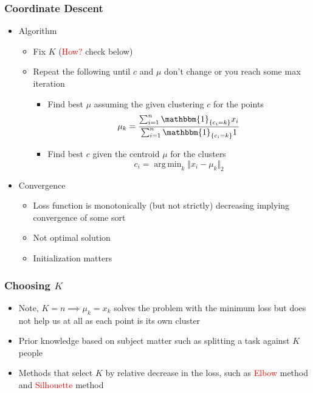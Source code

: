\documentclass{article}
\DeclareMathOperator*{\argmin}{arg\,min}
\newcommand{\red}[1]{\textcolor{red}{#1}}
\begin{document}
\subsubsection{Coordinate Descent}
\begin{itemize}
    \item Algorithm
        \begin{itemize}
            \item Fix $K$ (\red{How?} check below)
            \item Repeat the following until $c$ and $\mu$ don't change or you reach some max iteration
            \begin{itemize}
                \item Find best $\mu$ assuming the given clustering $c$ for the points
                    $$\mu_k = \frac{\sum_{i=1}^n \mathbbm{1}_{\{c_i=k\}} x_i}{\sum_{i=1}^n \mathbbm{1}_{\{c_i=k\}} 1}$$
                \item Find best $c$ given the centroid $\mu$ for the clusters
                    $$c_i = \argmin_{k} \Vert x_i-\mu_k \Vert_2$$
            \end{itemize}
        \end{itemize}
    \item Convergence
        \begin{itemize}
            \item Loss function is monotonically (but not strictly) decreasing implying convergence of some sort
            \item Not optimal solution
            \item Initialization matters
        \end{itemize}
\end{itemize}

\subsubsection{Choosing $K$}
\begin{itemize}
    \item Note, $K=n \implies \mu_k = x_k$ solves the problem with the minimum loss but does not help us at all as each point is its own cluster
    \item Prior knowledge based on subject matter such as splitting a task against $K$ people
    \item Methods that select $K$ by relative decrease in the loss, such as \red{Elbow} method and \red{Silhouette} method
\end{itemize}
\end{document}
